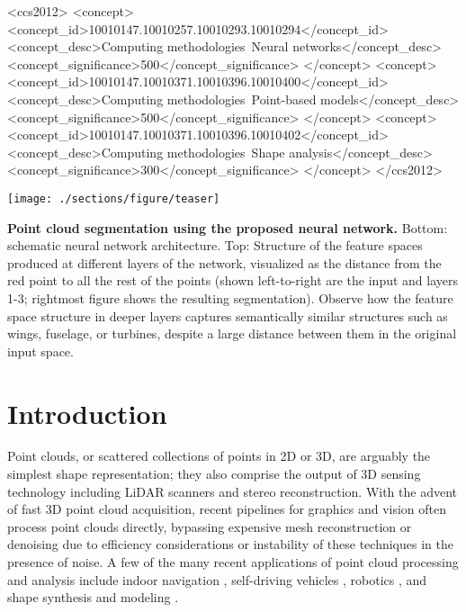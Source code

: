 \documentclass[acmtog]{acmart}
\begin{document}
\begin{CCSXML}
<ccs2012>
<concept>
<concept_id>10010147.10010257.10010293.10010294</concept_id>
<concept_desc>Computing methodologies~Neural networks</concept_desc>
<concept_significance>500</concept_significance>
</concept>
<concept>
<concept_id>10010147.10010371.10010396.10010400</concept_id>
<concept_desc>Computing methodologies~Point-based models</concept_desc>
<concept_significance>500</concept_significance>
</concept>
<concept>
<concept_id>10010147.10010371.10010396.10010402</concept_id>
<concept_desc>Computing methodologies~Shape analysis</concept_desc>
<concept_significance>300</concept_significance>
</concept>
</ccs2012>
\end{CCSXML}





\begin{teaserfigure}
 \centering
 \texttt{[image: ./sections/figure/teaser]}
 \caption{\textbf{Point cloud segmentation using the proposed neural network.} Bottom: schematic neural network architecture. Top: Structure of the feature spaces produced at different layers of the network, visualized as the distance from the red point to all the rest of the points (shown left-to-right are the input and layers 1-3; rightmost figure shows the resulting segmentation). Observe how the feature space structure in deeper layers captures semantically similar structures such as wings, fuselage, or turbines, despite a large distance between them in the original input space.}
\end{teaserfigure}

\maketitle



\section{Introduction}

Point clouds, or scattered collections of points in 2D or 3D, are arguably the simplest shape representation; they also comprise the output of 3D sensing technology including LiDAR scanners and stereo reconstruction.  With the advent of fast 3D point cloud acquisition, recent pipelines for graphics and vision often process point clouds directly, bypassing expensive mesh reconstruction or denoising due to efficiency considerations or instability of these techniques in the presence of noise.  A few of the many recent applications of point cloud processing and analysis include indoor navigation \cite{zhu2017}, self-driving vehicles \cite{qi2017frustum,wang2018cvpr,liang2018eccv}, robotics \cite{Rusu08RAS2}, and shape synthesis and modeling \cite{golovinskiy09,pcpnet}. 
\end{document}
